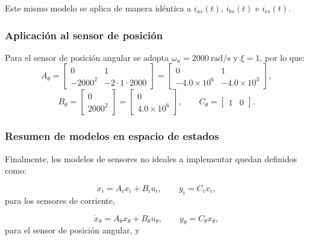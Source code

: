 \documentclass[12pt, a4paper,journal, onecolumn, compsoc]{IEEEtran}
\begin{document}
Este mismo modelo se aplica de manera idéntica a $i_{as}(t)$, $i_{bs}(t)$ e $i_{cs}(t)$.

\subsubsection*{Aplicación al sensor de posición}

Para el sensor de posición angular se adopta $\omega_n=2000\ \text{rad/s}$ y $\xi=1$, por lo que:
\begin{equation}
    A_\theta=
    \begin{bmatrix}
        0 & 1 \\
        -2000^2 & -2\cdot 1 \cdot 2000
    \end{bmatrix}
    =
    \begin{bmatrix}
        0 & 1 \\
        -4.0\times 10^6 & -4.0\times 10^3
    \end{bmatrix},
\end{equation}
\begin{equation}
    B_\theta=
    \begin{bmatrix}
        0 \\
        2000^2
    \end{bmatrix}
    =
    \begin{bmatrix}
        0 \\
        4.0\times 10^6
    \end{bmatrix},
    \qquad
    C_\theta=
    \begin{bmatrix}
        1 & 0
    \end{bmatrix}.
\end{equation}

\subsubsection*{Resumen de modelos en espacio de estados}

Finalmente, los modelos de sensores no ideales a implementar quedan definidos como:

\begin{equation}
    \dot{x}_i=A_i x_i + B_i u_i, \qquad y_i=C_i x_i,
\end{equation}
para los sensores de corriente,

\begin{equation}
    \dot{x}_\theta=A_\theta x_\theta + B_\theta u_\theta, \qquad y_\theta=C_\theta x_\theta,
\end{equation}
para el sensor de posición angular, y
\end{document}
